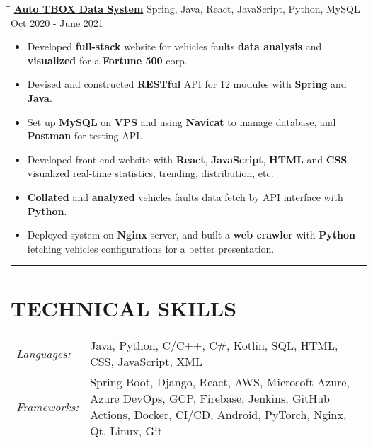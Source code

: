 \documentclass{res}
\begin{document}
\begin{resume}
    \vspace{-0.05in}	 
    \begin{tabbing}
    \hspace{2.3in}\= \hspace{3.45in}\= \kill %
    \href{https://github.com/DolorHunter/AutoTBOXDataSystem}{\bf Auto TBOX Data System}  \> 
                Spring, Java, React, JavaScript, Python, MySQL \> 
				Oct 2020 - June 2021
				\\
    \end{tabbing}\vspace{-20pt}      %
    \vspace{+0.1in}
    \begin{itemize} \itemsep 1.5pt %
        \item Developed {\bf full-stack} website for vehicles faults {\bf data analysis} and
        {\bf visualized} for a {\bf Fortune 500} corp.
        \item Devised and constructed {\bf RESTful} API for 12 modules with 
                {\bf Spring} and {\bf Java}.
        \item Set up {\bf MySQL} on {\bf VPS} and using {\bf Navicat} to manage database, and 
                {\bf Postman} for testing API.
        \item Developed front-end website with {\bf React}, {\bf JavaScript}, {\bf HTML} and {\bf CSS} visualized real-time statistics,  
                trending, distribution, etc.
        \item {\bf Collated} and {\bf analyzed} vehicles faults data fetch by API interface with 
                {\bf Python}.
        \item Deployed system on {\bf Nginx} server, and built a {\bf web crawler} with {\bf Python} fetching vehicles configurations for 
                a better presentation.
    \end{itemize}

      
\vspace{-2pt}
\hspace{-0.65in}
\noindent\rule[0.25\baselineskip]{19.36cm}{0.5pt}    

\vspace{-0.2in}
\section{TECHNICAL SKILLS}  
    \vspace{+0.1in}
    \hspace{-0.12in} 
    \begin{tabular}{l p{5.5in}}
    \rule{0in}{0.2in}
    {\sl Languages:} & Java, Python, C/C++, C\#, Kotlin, SQL, HTML, CSS, JavaScript, XML \\
    \rule{0in}{0.2in}
    {\sl Frameworks:} & Spring Boot, Django, React, AWS, Microsoft Azure, Azure DevOps, GCP, Firebase, 
                        Jenkins, GitHub Actions, Docker, CI/CD, Android, PyTorch, Nginx, Qt, Linux, Git
    \end{tabular}   
    
\end{resume}
\end{document}
